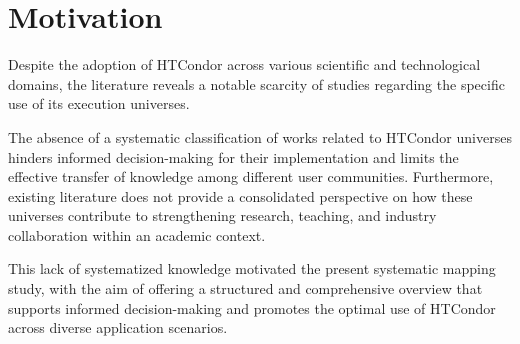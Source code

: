 \section{Motivation}
\label{sec:motivacion}
Despite the adoption of HTCondor across various scientific and technological domains, the literature reveals a notable scarcity of studies regarding the specific use of its execution universes.

The absence of a systematic classification of works related to HTCondor universes hinders informed decision-making for their implementation and limits the effective transfer of knowledge among different user communities. Furthermore, existing literature does not provide a consolidated perspective on how these universes contribute to strengthening research, teaching, and industry collaboration within an academic context.

This lack of systematized knowledge motivated the present systematic mapping study, with the aim of offering a structured and comprehensive overview that supports informed decision-making and promotes the optimal use of HTCondor across diverse application scenarios.